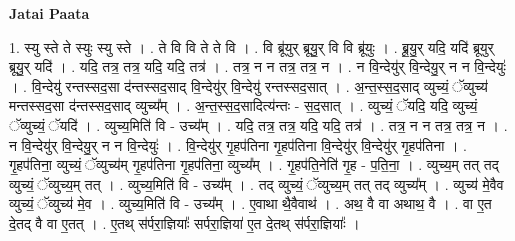 \documentclass[17pt]{extarticle}
\begin{document}
\textbf{Jatai Paata} \newline

1. स्यु स्ते ते स्युः स्यु स्ते । . ते वि वि ते ते वि । . वि ब्रू॑युर् ब्रूयु॒र् वि वि ब्रू॑युः । . ब्रू॒यु॒र् यदि॒ यदि॑ ब्रूयुर् ब्रूयु॒र् यदि॑ । . यदि॒ तत्र॒ तत्र॒ यदि॒ यदि॒ तत्र॑ । . तत्र॒ न न तत्र॒ तत्र॒ न । . न वि॒न्देयु॑र् वि॒न्देयु॒र् न न वि॒न्देयुः॑ । . वि॒न्देयु॑ रन्तस्सद॒सा द॑न्तस्सद॒साद् वि॒न्देयु॑र् वि॒न्देयु॑ रन्तस्सद॒सात् । . अ॒न्त॒स्स॒द॒साद् व्युच्यं॒ ॅव्युच्य॑ मन्तस्सद॒सा द॑न्तस्सद॒साद् व्युच्य᳚म् । . अ॒न्त॒स्स॒द॒सादित्य॑न्तः - स॒द॒सात् । . व्युच्यं॒ ॅयदि॒ यदि॒ व्युच्यं॒ ॅव्युच्यं॒ ॅयदि॑ । . व्युच्य॒मिति॑ वि - उच्य᳚म् । . यदि॒ तत्र॒ तत्र॒ यदि॒ यदि॒ तत्र॑ । . तत्र॒ न न तत्र॒ तत्र॒ न । . न वि॒न्देयु॑र् वि॒न्देयु॒र् न न वि॒न्देयुः॑ । . वि॒न्देयु॑र् गृ॒हप॑तिना गृ॒हप॑तिना वि॒न्देयु॑र् वि॒न्देयु॑र् गृ॒हप॑तिना । . गृ॒हप॑तिना॒ व्युच्यं॒ ॅव्युच्य॑म् गृ॒हप॑तिना गृ॒हप॑तिना॒ व्युच्य᳚म् । . गृ॒हप॑ति॒नेति॑ गृ॒ह - प॒ति॒ना॒ । . व्युच्य॒म् तत् तद् व्युच्यं॒ ॅव्युच्य॒म् तत् । . व्युच्य॒मिति॑ वि - उच्य᳚म् । . तद् व्युच्यं॒ ॅव्युच्य॒म् तत् तद् व्युच्य᳚म् । . व्युच्य॑ मे॒वैव व्युच्यं॒ ॅव्युच्य॑ मे॒व । . व्युच्य॒मिति॑ वि - उच्य᳚म् । . ए॒वाथा थै॒वैवाथ॑ । . अथ॒ वै वा अथाथ॒ वै । . वा ए॒त दे॒तद् वै वा ए॒तत् । . ए॒तथ् स॑र्परा॒ज्ञियाः᳚ सर्परा॒ज्ञिया॑ ए॒त दे॒तथ् स॑र्परा॒ज्ञियाः᳚ । \newline
\end{document}
